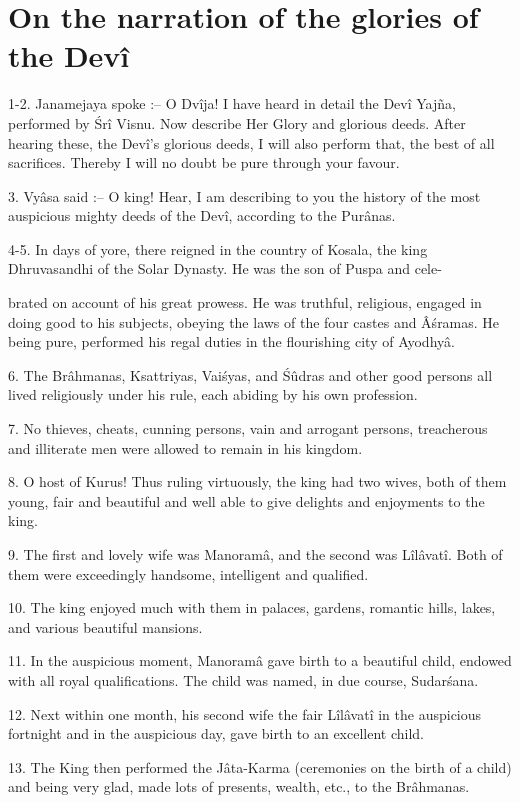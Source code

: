 ﻿\chapter{On the narration of the glories of the Dev\^i}

1-2. Janamejaya spoke :-- O Dv\^ija! I have heard in detail the Dev\^i Yaj\~na, performed by \'Sr\^i Visnu. Now describe Her Glory and glorious deeds. After hearing these, the Dev\^i's glorious deeds, I will also perform that, the best of all sacrifices. Thereby I will no doubt be pure through your favour.

3. Vy\^asa said :-- O king! Hear, I am describing to you the history of the most auspicious mighty deeds of the Dev\^i, according to the Pur\^anas.

4-5. In days of yore, there reigned in the country of Kosala, the king Dhruvasandhi of the Solar Dynasty. He was the son of Puspa and cele-

brated on account of his great prowess. He was truthful, religious, engaged in doing good to his subjects, obeying the laws of the four castes and Â\'sramas. He being pure, performed his regal duties in the flourishing city of Ayodhy\^a.

6. The Br\^ahmanas, Ksattriyas, Vai\'syas, and \'Sûdras and other good persons all lived religiously under his rule, each abiding by his own profession.

7. No thieves, cheats, cunning persons, vain and arrogant persons, treacherous and illiterate men were allowed to remain in his kingdom.

8. O host of Kurus! Thus ruling virtuously, the king had two wives, both of them young, fair and beautiful and well able to give delights and enjoyments to the king.

9. The first and lovely wife was Manoram\^a, and the second was L\^il\^avat\^i. Both of them were exceedingly handsome, intelligent and qualified.

10. The king enjoyed much with them in palaces, gardens, romantic hills, lakes, and various beautiful mansions.

11. In the auspicious moment, Manoram\^a gave birth to a beautiful child, endowed with all royal qualifications. The child was named, in due course, Sudar\'sana.

12. Next within one month, his second wife the fair L\^il\^avat\^i in the auspicious fortnight and in the auspicious day, gave birth to an excellent child.

13. The King then performed the J\^ata-Karma (ceremonies on the birth of a child) and being very glad, made lots of presents, wealth, etc., to the Br\^ahmanas.

